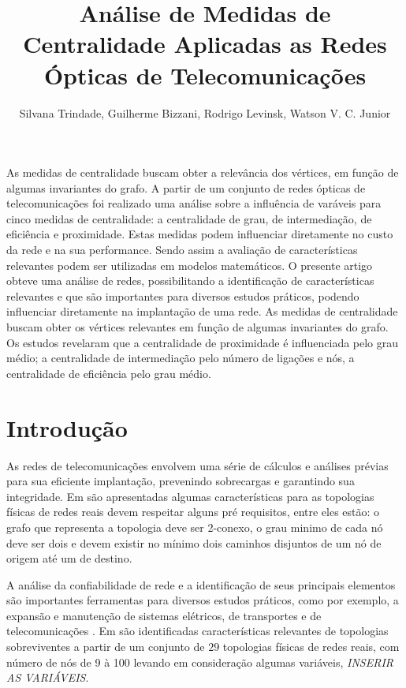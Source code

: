 \documentclass[12pt]{article}
\title{Análise de Medidas de Centralidade Aplicadas as Redes Ópticas de Telecomunicações}
\author{Silvana Trindade\inst{1}, Guilherme Bizzani\inst{1}, Rodrigo Levinsk\inst{1}, Watson V. C. Junior\inst{1}}
\begin{document}
 

\maketitle

\begin{abstract}
 
\end{abstract}
\begin{resumo} 

As medidas de centralidade buscam obter a relevância dos vértices, em função de algumas invariantes do grafo.
 A partir de um conjunto de redes ópticas de telecomunicações foi realizado uma análise sobre a influência de varáveis para cinco medidas de centralidade: a centralidade de grau, de intermediação, de eficiência e proximidade.
 Estas medidas podem influenciar diretamente no custo da rede e na sua performance.
 Sendo assim a avaliação de características relevantes podem ser utilizadas em modelos matemáticos.
O presente artigo obteve uma análise de redes, possibilitando a identificação de características relevantes e que são importantes para diversos estudos práticos, podendo influenciar diretamente na implantação de uma rede.
As medidas de centralidade buscam obter os vértices relevantes em função de algumas invariantes do grafo.
 Os estudos revelaram que a centralidade de proximidade é influenciada pelo grau médio; a centralidade de intermediação pelo número de ligações e nós, a centralidade de eficiência pelo grau médio.

\end{resumo}


\section{Introdução}
As redes de telecomunicações envolvem uma série de cálculos e análises prévias para sua eficiente implantação, prevenindo sobrecargas e garantindo sua integridade.
Em \cite{pavan} são apresentadas algumas características para as topologias físicas de redes reais devem respeitar alguns pré requisitos, entre eles estão: o grafo que representa a topologia deve ser  2-conexo, o grau minimo de cada nó deve ser dois e devem existir no mínimo dois caminhos disjuntos de um nó de origem até um de destino.

A análise da confiabilidade de rede e a identificação de seus principais elementos são importantes ferramentas para diversos estudos práticos, como por exemplo, a expansão e manutenção de sistemas elétricos, de transportes e de telecomunicações \cite{silva}.
Em \cite{pavan} são identificadas características relevantes de topologias sobreviventes a partir de um conjunto de $29$ topologias físicas de redes reais, com número de nós de 9 à 100 levando em consideração algumas variáveis, \textit{INSERIR AS VARIÁVEIS}. 
\end{document}
